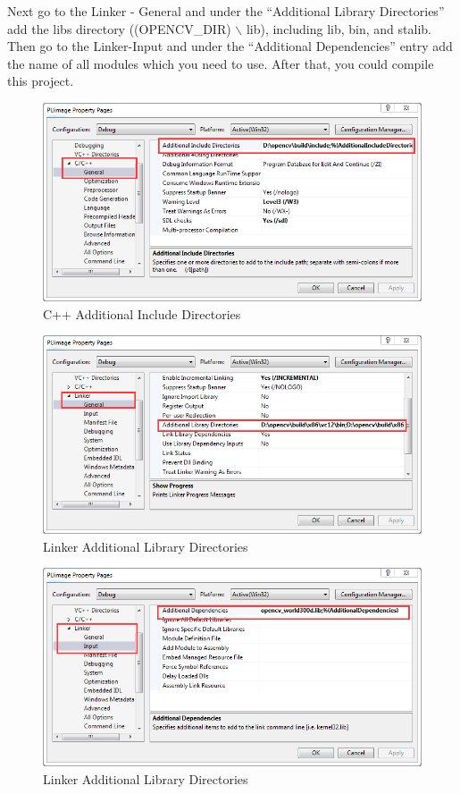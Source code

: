 \begin{enumerate}
Next go to the Linker - General and under the “Additional Library Directories” add the libs directory ((OPENCV\_DIR) $\backslash$ lib), including lib, bin, and stalib. Then go to the Linker-Input and under the “Additional Dependencies” entry add the name of all modules which you need to use. After that, you could compile this project.\\

\begin{figure}[!htb]
	\centering
	\includegraphics[scale=0.45]{img/user/Clink}
	\caption{C++ Additional Include Directories}
\end{figure}

\begin{figure}[!htb]
	\centering
	\includegraphics[scale=0.45]{img/user/linker}
	\caption{Linker Additional Library Directories}
\end{figure}

\begin{figure}[!htb]
	\centering
	\includegraphics[scale=0.45]{img/user/input}
	\caption{Linker Additional Library Directories}
\end{figure}

\end{enumerate}

